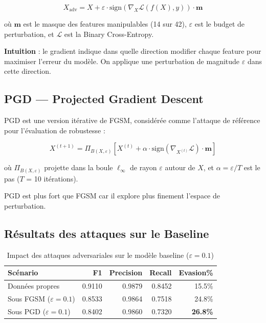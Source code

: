 \documentclass[11pt,a4paper]{article}
\begin{document}
\[
X_{\text{adv}} = X + \varepsilon \cdot \text{sign}\!\left(\nabla_X \mathcal{L}(f(X), y)\right) \cdot \mathbf{m}
\]

o\`u $\mathbf{m}$ est le masque des features manipulables (14 sur 42), $\varepsilon$ est le budget de perturbation,
et $\mathcal{L}$ est la Binary Cross-Entropy.

\textbf{Intuition} : le gradient indique dans quelle direction modifier chaque feature pour maximiser
l'erreur du mod\`ele. On applique une perturbation de magnitude $\varepsilon$ dans cette direction.

\subsection{PGD --- Projected Gradient Descent}

PGD \cite{madry2018} est une version it\'erative de FGSM, consid\'er\'ee comme l'attaque de r\'ef\'erence
pour l'\'evaluation de robustesse :

\[
X^{(t+1)} = \Pi_{B(X,\varepsilon)}\!\left[X^{(t)} + \alpha \cdot \text{sign}\!\left(\nabla_{X^{(t)}} \mathcal{L}\right) \cdot \mathbf{m}\right]
\]

o\`u $\Pi_{B(X,\varepsilon)}$ projette dans la boule $\ell_\infty$ de rayon $\varepsilon$ autour de $X$,
et $\alpha = \varepsilon / T$ est le pas ($T$ = 10 it\'erations).

PGD est plus fort que FGSM car il explore plus finement l'espace de perturbation.

\subsection{R\'esultats des attaques sur le Baseline}

\begin{table}[H]
\centering
\caption{Impact des attaques adversariales sur le mod\`ele baseline ($\varepsilon = 0.1$)}
\begin{tabular}{lrrrr}
\toprule
\textbf{Sc\'enario} & \textbf{F1} & \textbf{Precision} & \textbf{Recall} & \textbf{Evasion\%} \\
\midrule
Donn\'ees propres            & 0.9110 & 0.9879 & 0.8452 & 15.5\% \\
Sous FGSM ($\varepsilon=0.1$) & 0.8533 & 0.9864 & 0.7518 & 24.8\% \\
Sous PGD  ($\varepsilon=0.1$) & 0.8402 & 0.9860 & 0.7320 & \textbf{26.8\%} \\
\bottomrule
\end{tabular}
\end{table}
\end{document}

